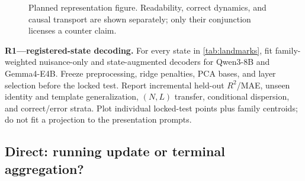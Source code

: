 \begin{figure}[H]
\centering
{}
\caption{Planned representation figure. Readability, correct dynamics, and
causal transport are shown separately; only their conjunction licenses a
counter claim.}
\label{fig:counter-todo}
\end{figure}

\begin{todobox}
\textbf{R1---registered-state decoding.}
For every state in \cref{tab:landmarks}, fit family-weighted nuisance-only and
state-augmented decoders for Qwen3-8B and Gemma4-E4B. Freeze preprocessing,
ridge penalties, PCA bases, and layer selection before the locked test.
Report incremental held-out \(R^2\)/MAE, unseen identity and template
generalization, \((N,L)\) transfer, conditional dispersion, and correct/error
strata. Plot individual locked-test points plus family centroids; do not fit a
projection to the presentation prompts.
\end{todobox}

\subsection{Direct: running update or terminal aggregation?}

